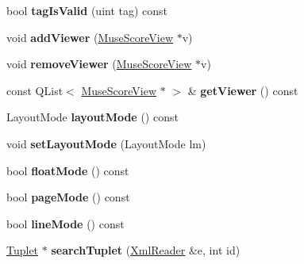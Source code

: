 \begin{DoxyCompactItemize}
\item 
\mbox{\label{class_ms_1_1_score_a1cb640ef003e3e86fe1631e56465cc22}} 
bool {\bfseries tag\+Is\+Valid} (uint tag) const
\item 
\mbox{\label{class_ms_1_1_score_ab53d6e1fa1a9c0652a3101613d126fef}} 
void {\bfseries add\+Viewer} (\hyperlink{class_ms_1_1_muse_score_view}{Muse\+Score\+View} $\ast$v)
\item 
\mbox{\label{class_ms_1_1_score_a8d4c17f0d115b9501be41346e3d4e68f}} 
void {\bfseries remove\+Viewer} (\hyperlink{class_ms_1_1_muse_score_view}{Muse\+Score\+View} $\ast$v)
\item 
\mbox{\label{class_ms_1_1_score_aab97c3e32db9ffed7379a1f71716cd59}} 
const Q\+List$<$ \hyperlink{class_ms_1_1_muse_score_view}{Muse\+Score\+View} $\ast$ $>$ \& {\bfseries get\+Viewer} () const
\item 
\mbox{\label{class_ms_1_1_score_a48d54ab45d94e4ef6a420f94d2612f18}} 
Layout\+Mode {\bfseries layout\+Mode} () const
\item 
\mbox{\label{class_ms_1_1_score_a29d3fbb8368a73421a48c09060bf5978}} 
void {\bfseries set\+Layout\+Mode} (Layout\+Mode lm)
\item 
\mbox{\label{class_ms_1_1_score_a982c38c0f5c51bc4de1df82480400673}} 
bool {\bfseries float\+Mode} () const
\item 
\mbox{\label{class_ms_1_1_score_a2be3e167f5b0eb35a4bd192f792a37f6}} 
bool {\bfseries page\+Mode} () const
\item 
\mbox{\label{class_ms_1_1_score_a7e623a06766698ff471836eac2f3fa57}} 
bool {\bfseries line\+Mode} () const
\item 
\mbox{\label{class_ms_1_1_score_a23247c225d8a1605c1093eee60a85bcc}} 
\hyperlink{class_ms_1_1_tuplet}{Tuplet} $\ast$ {\bfseries search\+Tuplet} (\hyperlink{class_ms_1_1_xml_reader}{Xml\+Reader} \&e, int id)
\item 
\mbox{\label{class_ms_1_1_score_ab600bfbe5b47f929590ec168ecff8bd0}} 

\end{DoxyCompactItemize}
